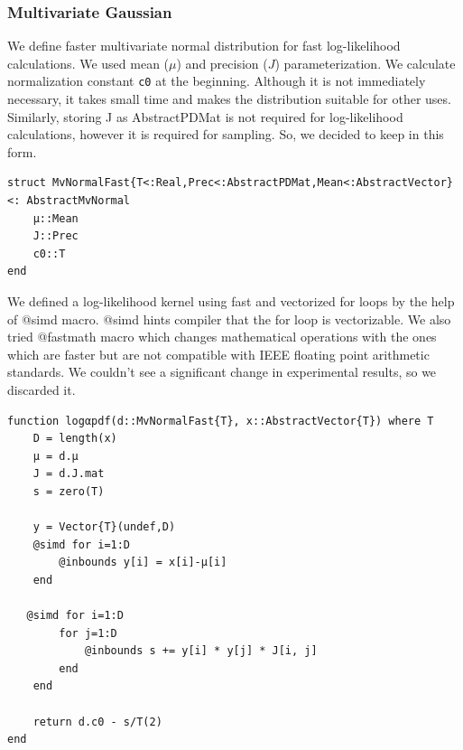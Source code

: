 \documentclass[12pt, a4paper]{article}
\newenvironment{code}{\captionsetup{type=listing}}{}
\begin{document}
\subsubsection{Multivariate Gaussian}
We define faster multivariate normal distribution for fast log-likelihood calculations. We used mean ($\mu$) and precision ($J$) parameterization. We calculate normalization constant \texttt{c0} at the beginning. Although it is not immediately necessary, it takes small time and makes the distribution suitable for other uses. Similarly, storing J as AbstractPDMat is not required for log-likelihood calculations, however it is required for sampling. So, we decided to keep in this form.
\begin{code}
\label{code:mvfast-code}
\begin{verbatim}
struct MvNormalFast{T<:Real,Prec<:AbstractPDMat,Mean<:AbstractVector} <: AbstractMvNormal
    μ::Mean
    J::Prec
    c0::T
end
\end{verbatim}
\end{code}
We defined a log-likelihood kernel using fast and vectorized for loops by the help of @simd macro. @simd  hints compiler that the for loop is vectorizable. We also tried @fastmath macro which changes mathematical operations with the ones which are faster but are not compatible with IEEE floating point arithmetic standards. We couldn't see a significant change in experimental results, so we discarded it.
\begin{code}
\label{code:gaussian}
\begin{verbatim}
function logαpdf(d::MvNormalFast{T}, x::AbstractVector{T}) where T
    D = length(x)
    μ = d.μ
    J = d.J.mat
    s = zero(T)

    y = Vector{T}(undef,D)
    @simd for i=1:D
        @inbounds y[i] = x[i]-μ[i]
    end

   @simd for i=1:D
        for j=1:D
            @inbounds s += y[i] * y[j] * J[i, j]
        end
    end

    return d.c0 - s/T(2)
end
\end{verbatim}
\end{code}
\end{document}
